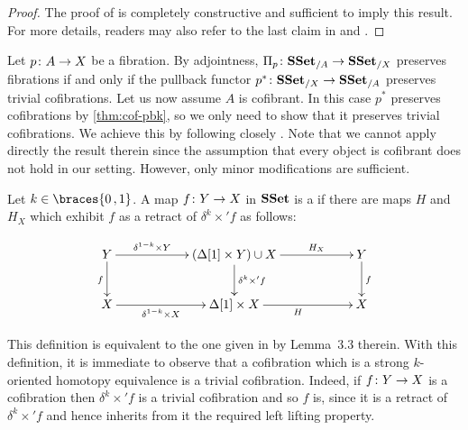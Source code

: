 \documentclass[reqno,10pt,a4paper,oneside,draft]{amsart}
\begin{document}
\begin{proof}The proof of \cite[Theorem~3.2.3]{joyal-tierney:simplicial-homotopy-theory} is completely constructive and sufficient to imply this result.
For more details, readers may also refer to the last claim in \cite[Corollary~5.3.2]{henry2018wms}
and \cite[Proposition~5.2.6]{henry2018wms}.
\end{proof}



Let $p \colon A \rightarrow X$ be a fibration. By adjointness, $\Pi_p \colon \mathbf{SSet}_{/A} \to \mathbf{SSet}_{/X}$  preserves fibrations if and only if the pullback functor $p^* \colon \mathbf{SSet}_{/X} \to \mathbf{SSet}_{/A}$ preserves trivial cofibrations. Let us now assume  $A$ is cofibrant. 
In this case $p^*$ preserves cofibrations by \cref{thm:cof-pbk}, so we only need to show that it preserves
trivial cofibrations. We achieve this by following closely \cite[Section~3]{gambino2017frobenius}. Note that we cannot apply directly the result therein since 
the assumption that every object is cofibrant does not hold in our setting. However, only minor modifications are sufficient.




\begin{definition} \label{def:strhtpyequiv} Let $k \in \braces{0 \, , 1 }$.
A map $f \colon Y \rightarrow X$ in $\mathbf{SSet}$ is a  if there are maps $H$ and $H_X$ which exhibit $f$ as a retract of $\delta^k \times ' f$ as follows:

\[
\xymatrix@C=2cm{
Y \ar[d]_{f} \ar[r]^-{\delta^{1-k} \times Y} & 
( \Delta[1] \times Y ) \cup X \ar[d]^{\delta^k \times' f} \ar[r]^-{H_X} & 
Y \ar[d]^{f} \\
X \ar[r]_-{\delta^{1-k} \times X}  & 
\Delta[1] \times X \ar[r]_{H} &
X  }
\]
\end{definition}

This definition is equivalent to the one given in \cite{gambino2017frobenius} by Lemma~3.3 therein.
With this definition, it is immediate to observe that a cofibration which is a strong $k$-oriented homotopy equivalence is a trivial cofibration. Indeed, if $f \colon Y \to X$ is a cofibration then $\delta^k \times ' f$ is a trivial
cofibration and so $f$ is, since it is a retract of $\delta^k \times ' f$ and hence inherits from it the
required left lifting property.
\end{document}
